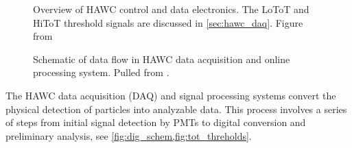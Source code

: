 \begin{figure}
    \caption{Overview of HAWC control and data electronics. The LoToT and HiToT threshold signals are discussed in \cref{sec:hawc_daq}. Figure from \cite{HAWC_NIM}}
    \label{fig:basic_tanks_schem}
\end{figure}

\begin{figure}
    \caption{Schematic of data flow in HAWC data acquisition and online processing system. Pulled from \cite{HAWC_DAQ_NIM}.}
    \label{fig:dig_schem}
\end{figure}

The HAWC data acquisition (DAQ) and signal processing systems convert the physical detection of particles into analyzable data.
This process involves a series of steps from initial signal detection by PMTs to digital conversion and preliminary analysis, see \cref{fig:dig_schem,fig:tot_threholds}.

